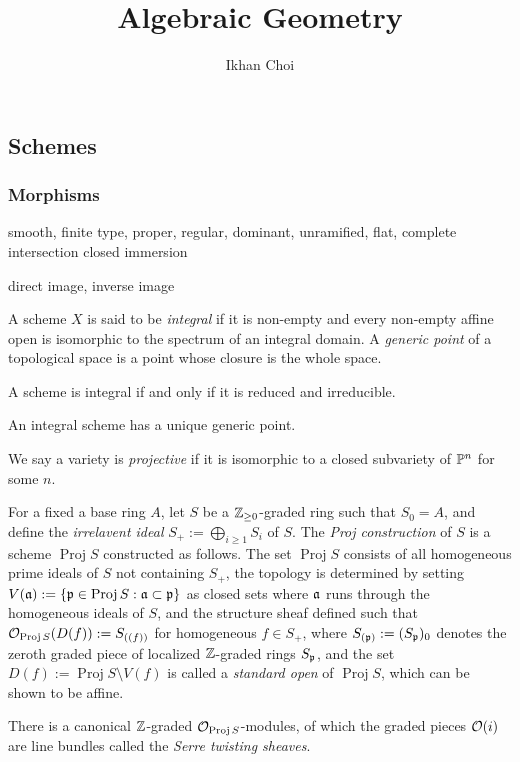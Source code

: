 \documentclass{../../large}
\newcommand{\Proj}{\operatorname{Proj}}
\begin{document}
\title{Algebraic Geometry}
\author{Ikhan Choi}
\maketitle
\tableofcontents

\part{}


\chapter{Schemes}

\section{Morphisms}
smooth, finite type, proper, regular, dominant, unramified, flat, complete intersection
closed immersion


direct image, inverse image




\begin{prb}
A scheme $X$ is said to be \emph{integral} if it is non-empty and every non-empty affine open is isomorphic to the spectrum of an integral domain.
A \emph{generic point} of a topological space is a point whose closure is the whole space.
\begin{parts}
\item A scheme is integral if and only if it is reduced and irreducible.
\item An integral scheme has a unique generic point.
\end{parts}
\end{prb}


\begin{prb}
We say a variety is \emph{projective} if it is isomorphic to a closed subvariety of $\P^n$ for some $n$.

For a fixed a base ring $A$, let $S$ be a $\Z_{\ge0}$-graded ring such that $S_0=A$, and define the \emph{irrelavent ideal} $S_+:=\bigoplus_{i\ge1}S_i$ of $S$.
The \emph{Proj construction} of $S$ is a scheme $\Proj S$ constructed as follows.
The set $\Proj S$ consists of all homogeneous prime ideals of $S$ not containing $S_+$, the topology is determined by setting $V(\fa):=\{\fp\in\Proj S:\fa\subset\fp\}$ as closed sets where $\fa$ runs through the homogeneous ideals of $S$, and the structure sheaf defined such that $\cO_{\Proj S}(D(f)):=S_{((f))}$ for homogeneous $f\in S_+$, where $S_{(\fp)}:=(S_\fp)_0$ denotes the zeroth graded piece of localized $\Z$-graded rings $S_\fp$, and the set $D(f):=\Proj S\setminus V(f)$ is called a \emph{standard open} of $\Proj S$, which can be shown to be affine.

There is a canonical $\Z$-graded $\cO_{\Proj S}$-modules, of which the graded pieces $\cO(i)$ are line bundles called the \emph{Serre twisting sheaves}.
\end{prb}
\end{document}
